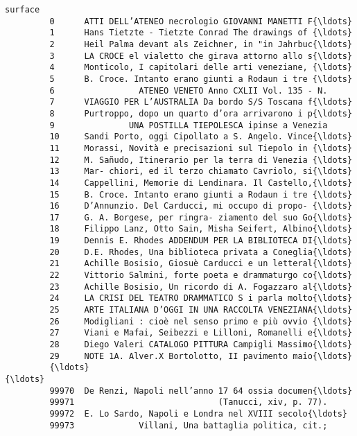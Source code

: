 \documentclass[11pt]{article}
\begin{document}
\begin{Verbatim}[commandchars=\\\{\}]
                                                          surface  
         0      ATTI DELL’ATENEO necrologio GIOVANNI MANETTI F{\ldots}  
         1      Hans Tietzte - Tietzte Conrad The drawings of {\ldots}  
         2      Heil Palma devant als Zeichner, in "in Jahrbuc{\ldots}  
         3      LA CROCE el vialetto che girava attorno allo s{\ldots}  
         4      Monticolo, I capitolari delle arti veneziane, {\ldots}  
         5      B. Croce. Intanto erano giunti a Rodaun i tre {\ldots}  
         6                 ATENEO VENETO Anno CXLII Vol. 135 - N.  
         7      VIAGGIO PER L’AUSTRALIA Da bordo S/S Toscana f{\ldots}  
         8      Purtroppo, dopo un quarto d’ora arrivarono i p{\ldots}  
         9               UNA POSTILLA TIEPOLESCA ipinse a Venezia  
         10     Sandi Porto, oggi Cipollato a S. Angelo. Vince{\ldots}  
         11     Morassi, Novità e precisazioni sul Tiepolo in {\ldots}  
         12     M. Sañudo, Itinerario per la terra di Venezia {\ldots}  
         13     Mar- chiori, ed il terzo chiamato Cavriolo, si{\ldots}  
         14     Cappellini, Memorie di Lendinara. Il Castello,{\ldots}  
         15     B. Croce. Intanto erano giunti a Rodaun i tre {\ldots}  
         16     D’Annunzio. Del Carducci, mi occupo di propo- {\ldots}  
         17     G. A. Borgese, per ringra- ziamento del suo Go{\ldots}  
         18     Filippo Lanz, Otto Sain, Misha Seifert, Albino{\ldots}  
         19     Dennis E. Rhodes ADDENDUM PER LA BIBLIOTECA DI{\ldots}  
         20     D.E. Rhodes, Una biblioteca privata a Coneglia{\ldots}  
         21     Achille Bosisio, Giosuè Carducci e un letteral{\ldots}  
         22     Vittorio Salmini, forte poeta e drammaturgo co{\ldots}  
         23     Achille Bosisio, Un ricordo di A. Fogazzaro al{\ldots}  
         24     LA CRISI DEL TEATRO DRAMMATICO S i parla molto{\ldots}  
         25     ARTE ITALIANA D’OGGI IN UNA RACCOLTA VENEZIANA{\ldots}  
         26     Modigliani : cioè nel senso primo e più ovvio {\ldots}  
         27     Viani e Mafai, Seibezzi e Lilloni, Romanelli e{\ldots}  
         28     Diego Valeri CATALOGO PITTURA Campigli Massimo{\ldots}  
         29     NOTE 1A. Alver.X Bortolotto, II pavimento maio{\ldots}  
         {\ldots}                                                  {\ldots}  
         99970  De Renzi, Napoli nell’anno 17 64 ossia documen{\ldots}  
         99971                             (Tanucci, xiv, p. 77).  
         99972  E. Lo Sardo, Napoli e Londra nel XVIII secolo{\ldots}  
         99973             Villani, Una battaglia politica, cit.;  

\end{Verbatim}
\end{document}
